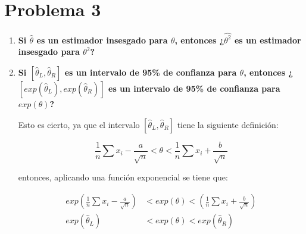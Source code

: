\section*{Problema 3}

\begin{enumerate}
    \item \textbf{Si $\hat{\theta}$ es un estimador insesgado para $\theta$, entonces ¿$\hat{\theta^2}$ es un estimador insesgado para $\theta^2$?}
    \item \textbf{Si $[\hat{\theta}_L, \hat{\theta}_R]$ es un intervalo de 95\% de confianza para $\theta$, entonces ¿$[exp(\hat{\theta}_L),exp(\hat{\theta}_R)]$ es un intervalo de 95\% de confianza para $exp(\theta)$?}

          Esto es cierto, ya que el intervalo $[\hat{\theta}_L, \hat{\theta}_R]$ tiene la siguiente definición:

          \begin{equation*}
              \frac{1}{n} \sum x_i - \frac{a}{\sqrt{n}}<\theta<\frac{1}{n} \sum x_i + \frac{b}{\sqrt{n}}
          \end{equation*}

          entonces, aplicando una función exponencial se tiene que:

          \begin{align*}
              exp\left (\frac{1}{n} \sum x_i - \frac{a}{\sqrt{n}}\right ) & <exp(\theta)<\left ( \frac{1}{n} \sum x_i + \frac{b}{\sqrt{n}} \right ) \\
              exp(\hat{\theta}_L)                                         & < exp(\theta) < exp(\hat{\theta}_R)
          \end{align*}
\end{enumerate}